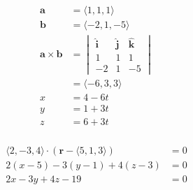 \documentclass{article}
\begin{document}
\setcounter{subsubsection}{36}
\subsubsection{}

\begin{align*}
  \mathbf{a}                   & = \langle 1, 1, 1 \rangle                                                                       \\
  \mathbf{b}                   & = \langle -2, 1, -5 \rangle                                                                     \\
  \mathbf{a} \times \mathbf{b} & = \begin{vmatrix}
                                     \hat{\mathbf{i}} & \hat{\mathbf{j}} & \hat{\mathbf{k}} \\
                                     1                & 1                & 1                \\
                                     -2               & 1                & -5
                                   \end{vmatrix} \\
                               & = \langle -6, 3, 3 \rangle                                                                      \\
  x                            & = 4 - 6 t                                                                                       \\
  y                            & = 1 + 3 t                                                                                       \\
  z                            & = 6 + 3 t
\end{align*}

\setcounter{subsubsection}{38}
\subsubsection{}

\begin{align*}
  \langle 2, -3, 4 \rangle \cdot (\mathbf{r} - \langle 5, 1, 3 \rangle) & = 0 \\
  2 (x - 5) - 3 (y - 1) + 4 (z - 3)                                     & = 0 \\
  2 x - 3 y + 4 z - 19                                                  & = 0
\end{align*}

\setcounter{subsubsection}{44}
\end{document}
